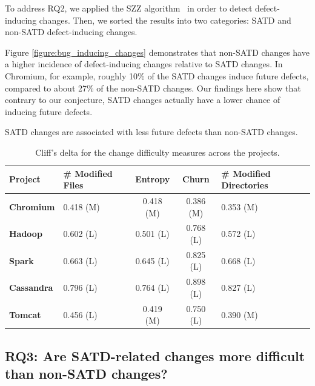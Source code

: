 To address RQ2, we applied the SZZ algorithm~\cite{sliwerski-msr-2005} in order to detect defect-inducing changes. Then, we sorted the results into two categories: SATD and non-SATD defect-inducing changes.




Figure \ref{figure:bug_inducing_changes} demonstrates that non-SATD changes have a higher incidence of defect-inducing changes relative to SATD changes.  In Chromium, for example, roughly 10\% of the SATD changes induce future defects, compared to about 27\% of the non-SATD changes. Our findings here show that contrary to our conjecture, SATD changes actually have a lower chance of inducing future defects.

\begin{myboxii}
	SATD changes are associated with less future defects than non-SATD changes.
\end{myboxii}




\begin{table}[tb!]
	\setlength{\tabcolsep}{.7\tabcolsep}
	\centering
	\caption{Cliff's delta for the change difficulty measures across the projects.}
	\begin{tabular}{l|C{1.5in}|c|c|C{2in}}
		\hline
		\textbf{Project}   & {\bf \# Modified Files}    & {\bf Entropy} & {\bf Churn} & {\bf\# Modified Directories}    \\ \hline
		\textbf{Chromium}  & 0.418 (M) & 0.418 (M)   & 0.386 (M) & 0.353 (M) \\ \hline
		\textbf{Hadoop}    & 0.602 (L) & 0.501 (L)   & 0.768 (L) & 0.572 (L) \\ \hline
		\textbf{Spark}     & 0.663 (L) & 0.645 (L)   & 0.825 (L) & 0.668 (L)\\ \hline
		\textbf{Cassandra} & 0.796 (L) & 0.764 (L)   & 0.898 (L) & 0.827 (L) \\ \hline
		\textbf{Tomcat}    & 0.456 (L) & 0.419 (M)   & 0.750 (L) & 0.390 (M) \\ \hline
	\end{tabular}
	\label{table:cliff_deltas_RQ3}
\end{table}

\subsection*{RQ3: Are SATD-related changes more difficult than non-SATD changes?}

